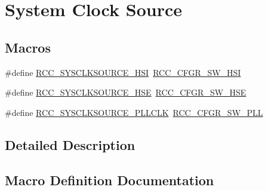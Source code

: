 \hypertarget{group___r_c_c___system___clock___source}{}\section{System Clock Source}
\label{group___r_c_c___system___clock___source}
\subsection*{Macros}
\begin{DoxyCompactItemize}
\item 
\#define \hyperlink{group___r_c_c___system___clock___source_gaaeeb699502e7d7a9f1b5d57fcf1f5095}{R\+C\+C\+\_\+\+S\+Y\+S\+C\+L\+K\+S\+O\+U\+R\+C\+E\+\_\+\+H\+SI}~\hyperlink{group___peripheral___registers___bits___definition_gacbac8bae4f0808b3c3a5185aa10081fb}{R\+C\+C\+\_\+\+C\+F\+G\+R\+\_\+\+S\+W\+\_\+\+H\+SI}
\item 
\#define \hyperlink{group___r_c_c___system___clock___source_ga9116d0627e1e7f33c48e1357b9a35a1c}{R\+C\+C\+\_\+\+S\+Y\+S\+C\+L\+K\+S\+O\+U\+R\+C\+E\+\_\+\+H\+SE}~\hyperlink{group___peripheral___registers___bits___definition_gafb563f217242d969f4355d0818fde705}{R\+C\+C\+\_\+\+C\+F\+G\+R\+\_\+\+S\+W\+\_\+\+H\+SE}
\item 
\#define \hyperlink{group___r_c_c___system___clock___source_ga5caf08ac71d7dd7e7b2e3e421606aca7}{R\+C\+C\+\_\+\+S\+Y\+S\+C\+L\+K\+S\+O\+U\+R\+C\+E\+\_\+\+P\+L\+L\+C\+LK}~\hyperlink{group___peripheral___registers___bits___definition_ga87389cacb2eaf53730da13a2a33cd487}{R\+C\+C\+\_\+\+C\+F\+G\+R\+\_\+\+S\+W\+\_\+\+P\+LL}
\end{DoxyCompactItemize}


\subsection{Detailed Description}


\subsection{Macro Definition Documentation}
\mbox{\label{group___r_c_c___system___clock___source_ga9116d0627e1e7f33c48e1357b9a35a1c}} 
